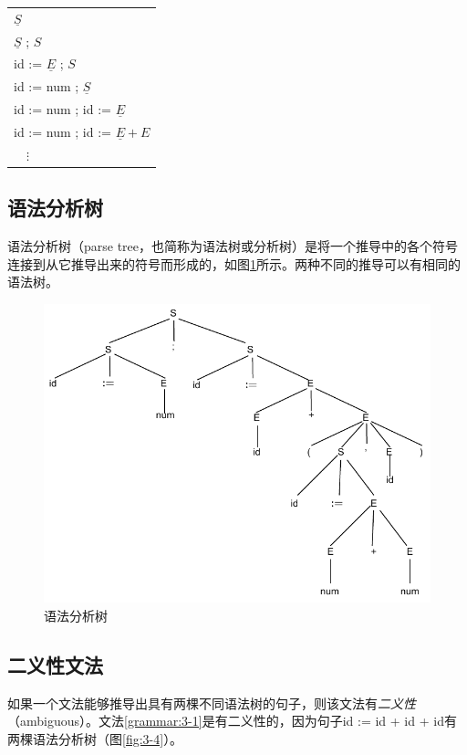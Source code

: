 \documentclass[cn,11pt,chinese]{elegantbook}
\begin{document}
\begin{center}
\begin{tabular}{l}
  $\underline{S}$ \\
  $\underline{S}$ ; $S$ \\
  id := $\underline{E}$ ; $S$ \\
  id := num ; $\underline{S}$ \\
  id := num ; id := $\underline{E}$ \\
  id := num ; id := $\underline{E} + E$ \\
  $\quad\vdots$ \\
\end{tabular}
\end{center}

\subsection{语法分析树}

语法分析树（parse tree，也简称为语法树或分析树）是将一个推导中的各个符号连接到从它推导出来的符号而形成的，如图\ref{fig:3-3}所示。两种不同的推导可以有相同的语法树。

\begin{figure}[htbp]
  \centering
  \includegraphics[width=.8\textwidth]{3-3.pdf}
  \caption{语法分析树}
  \label{fig:3-3}
\end{figure}

\subsection{二义性文法}

如果一个文法能够推导出具有两棵不同语法树的句子，则该文法有\textit{二义性}（ambiguous）。文法\ref{grammar:3-1}是有二义性的，因为句子id := id + id + id有两棵语法分析树（图\ref{fig:3-4}）。
\end{document}
